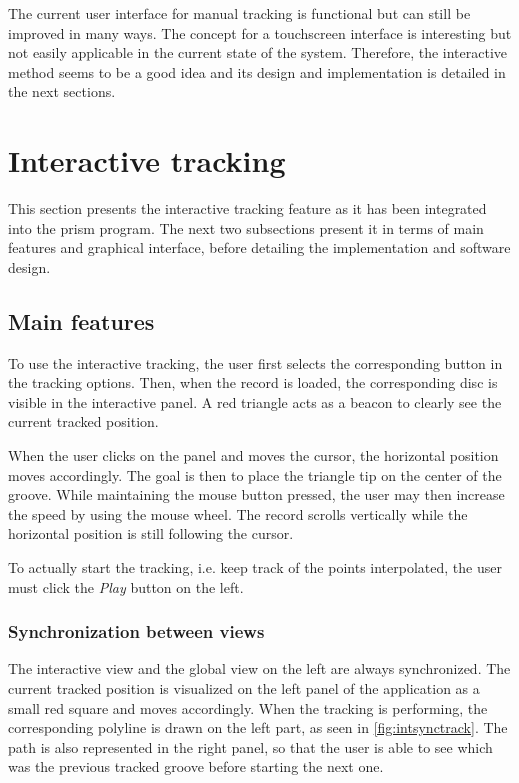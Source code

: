 The current user interface for manual tracking is functional but can still be improved in many ways. The concept for a touchscreen interface is interesting but not easily applicable in the current state of the system. Therefore, the interactive method seems to be a good idea and its design and implementation is detailed in the next sections.

\section{Interactive tracking}
\label{sec:inttracking}

This section presents the interactive tracking feature as it has been integrated into the \gls{prism} program. The next two subsections present it in terms of main features and graphical interface, before detailing the implementation and software design.

\subsection{Main features}
\label{sec:intfeatures}

To use the interactive tracking, the user first selects the corresponding button in the tracking options. Then, when the record is loaded, the corresponding disc is visible in the interactive panel. A red triangle acts as a beacon to clearly see the current tracked position.

When the user clicks on the panel and moves the cursor, the horizontal position moves accordingly. The goal is then to place the triangle tip on the center of the groove. While maintaining the mouse button pressed, the user may then increase the speed by using the mouse wheel. The record scrolls vertically while the horizontal position is still following the cursor.

To actually start the tracking, i.e. keep track of the points interpolated, the user must click the \emph{Play} button on the left.

\subsubsection{Synchronization between views}

The interactive view and the global view on the left are always synchronized. The current tracked position is visualized on the left panel of the application as a small red square and moves accordingly. When the tracking is performing, the corresponding polyline is drawn on the left part, as seen in \autoref{fig:intsynctrack}. The path is also represented in the right panel, so that the user is able to see which was the previous tracked groove before starting the next one.

